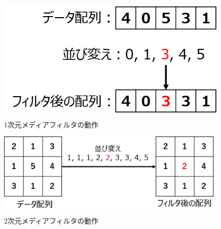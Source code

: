 \begin{figure}[htbp]
	\begin{center}
		\includegraphics[scale=0.51]{./images/old-study/median-filter.png}
		\caption{1次元メディアフィルタの動作}
		\label{fig:median-filter}		
	\end{center}
\end{figure}

\begin{figure}[htbp]
	\begin{center}
		\includegraphics[scale=0.5]{./images/old-study/median-filter2.png}
		\caption{2次元メディアフィルタの動作}
		\label{fig:median-filter2}
	\end{center}
\end{figure}


